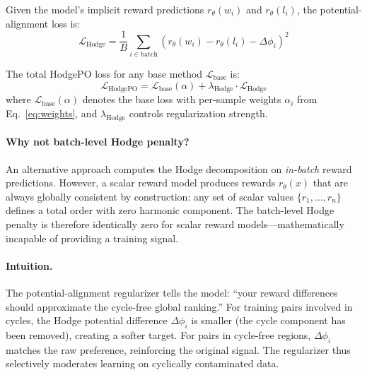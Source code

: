 \documentclass{article}
\begin{document}
Given the model's implicit reward predictions $r_\theta(w_i)$ and $r_\theta(l_i)$, the potential-alignment loss is:
\begin{equation}
    \mathcal{L}_\text{Hodge} = \frac{1}{B} \sum_{i \in \text{batch}} \left(r_\theta(w_i) - r_\theta(l_i) - \Delta\phi_i\right)^2
\label{eq:hodge_loss}
\end{equation}

The total HodgePO loss for any base method $\mathcal{L}_\text{base}$ is:
\begin{equation}
    \mathcal{L}_\text{HodgePO} = \mathcal{L}_\text{base}(\alpha) + \lambda_\text{Hodge} \cdot \mathcal{L}_\text{Hodge}
\label{eq:total_loss}
\end{equation}
where $\mathcal{L}_\text{base}(\alpha)$ denotes the base loss with per-sample weights $\alpha_i$ from Eq.~\ref{eq:weights}, and $\lambda_\text{Hodge}$ controls regularization strength.

\paragraph{Why not batch-level Hodge penalty?} An alternative approach computes the Hodge decomposition on \emph{in-batch} reward predictions. However, a scalar reward model produces rewards $r_\theta(x)$ that are always globally consistent by construction: any set of scalar values $\{r_1, \dots, r_n\}$ defines a total order with zero harmonic component. The batch-level Hodge penalty is therefore identically zero for scalar reward models---mathematically incapable of providing a training signal.

\paragraph{Intuition.} The potential-alignment regularizer tells the model: ``your reward differences should approximate the cycle-free global ranking.'' For training pairs involved in cycles, the Hodge potential difference $\Delta\phi_i$ is smaller (the cycle component has been removed), creating a softer target. For pairs in cycle-free regions, $\Delta\phi_i$ matches the raw preference, reinforcing the original signal. The regularizer thus selectively moderates learning on cyclically contaminated data.
\end{document}
